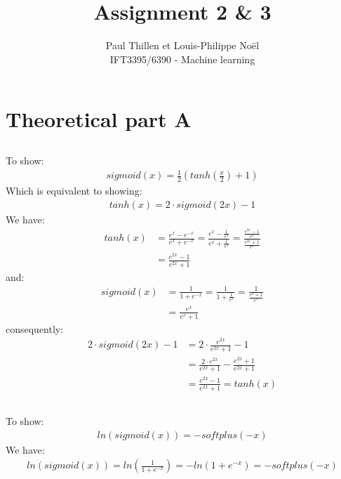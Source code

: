 \documentclass[12pt]{article}
\begin{document}
 

 
\title{Assignment 2 \& 3}%
\author{Paul Thillen et Louis-Philippe Noël\\ %
IFT3395/6390 - Machine learning} %
 
\maketitle
 
\section{Theoretical part A}
\subsection{}
To show: 
\begin{align*}
sigmoid(x)=\frac{1}{2} ( tanh(\frac{x}{2})+1)
\end{align*}
Which is equivalent to showing:
\begin{align*}
tanh(x) = 2 \cdot sigmoid(2x)-1
\end{align*}
We have:
\begin{align*}
tanh(x) & = \frac{e^x-e^{-x}}{e^x+e^{-x}} = \frac{e^x-\frac{1}{e^x}}{e^x+\frac{1}{e^x}} = \frac{\frac{e^{2x}-1}{e^x}}{\frac{e^{2x}+1}{e^x}} \\
& = \frac{e^{2x}-1}{e^{2x}+1}
\end{align*}
and:
\begin{align*}
sigmoid(x) &= \frac{1}{1+e^{-x}} =  \frac{1}{1+\frac{1}{e^{x}}} = \frac{1}{\frac{e^x+1}{e^x}} \\
& = \frac{e^x}{e^x+1}
\end{align*}
consequently:
\begin{align*}
2 \cdot sigmoid(2x) - 1 & = 2 \cdot \frac{ e^{2x}}{e^{2x}+1}-1 \\
& = \frac{ 2 \cdot e^{2x}}{e^{2x}+1}- \frac{e^{2x}+1}{e^{2x}+1} \\
& = \frac{e^{2x}-1}{e^{2x}+1} = tanh(x)
\end{align*}
\subsection{}
To show:
\begin{align*}
ln(sigmoid(x)) = -softplus(-x)
\end{align*}
We have:
\begin{align*}
ln(sigmoid(x)) = ln ( \frac{1}{1+e^{-x}} ) = - ln( 1+e^{-x} ) = - softplus(-x)
\end{align*}
\end{document}
